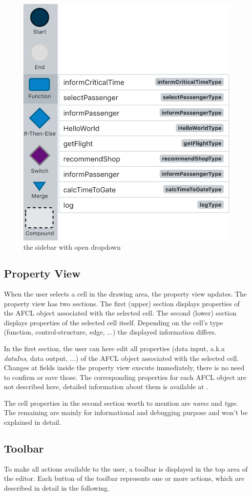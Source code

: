 \documentclass[a4paper,top=25mm,bottom=25mm,12pt,pdftex,halfparskip,twoside,bibtotoc,numbers=noenddot]{scrbook}
\begin{document}
\begin{figure}[H]
\centering
\includegraphics[width=.4\textwidth]{sidebar}
\caption{the sidebar with open dropdown}
\label{fig:editor-sidebar}
\end{figure}

\subsection{Property View}

When the user selects a cell in the drawing area, the property view updates. The property view has two sections. The first (upper) section displays properties of the AFCL object associated with the selected cell. The second (lower) section displays properties of the selected cell itself. Depending on the cell's type (function, control-structure, edge, ...) the displayed information differs.

In the first section, the user can here edit all properties (data input, a.k.a \textit{dataIns}, data output, ...) of the AFCL object associated with the selected cell. Changes at fields inside the property view execute immediately, there is no need to confirm or save those.
The corresponding properties for each AFCL object are not described here, detailed information about them is available at \citep{online-afcl-dps}.

The cell properties in the second section worth to mention are \textit{name} and \textit{type}. The remaining are mainly for informational and debugging purpose and won't be explained in detail.

\subsection{Toolbar}

To make all actions available to the user, a toolbar is displayed in the top area of the editor. Each button of the toolbar represents one or more actions, which are described in detail in the following.
\end{document}
